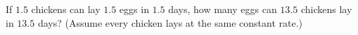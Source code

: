 If $1.5$ chickens can lay $1.5$ eggs in $1.5$ days, how many eggs can $13.5$ chickens lay in $13.5$ days? (Assume every chicken lays at the same constant rate.)
